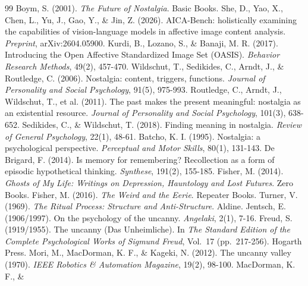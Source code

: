 \documentclass[11pt]{article}
\begin{document}
\begin{thebibliography}{99}
 Boym, S. (2001). \emph{The Future of Nostalgia}. Basic
Books.
 She, D., Yao, X., Chen, L., Yu, J., Gao, Y., \&
Jin, Z. (2026). AICA-Bench: holistically examining the capabilities of vision-language models in
affective image content analysis. \emph{Preprint}, arXiv:2604.05900.
 Kurdi, B., Lozano, S., \& Banaji, M. R. (2017).
Introducing the Open Affective Standardized Image Set (OASIS). \emph{Behavior Research
Methods}, 49(2), 457-470.
 Wildschut, T., Sedikides, C., Arndt, J.,
\& Routledge, C. (2006). Nostalgia: content, triggers, functions. \emph{Journal of
Personality and Social Psychology}, 91(5), 975-993.
 Routledge, C., Arndt, J., Wildschut, T.,
et al. (2011). The past makes the present meaningful: nostalgia as an existential
resource. \emph{Journal of Personality and Social Psychology}, 101(3), 638-652.
 Sedikides, C., \& Wildschut, T.
(2018). Finding meaning in nostalgia. \emph{Review of General Psychology}, 22(1), 48-61.
 Batcho, K. I. (1995). Nostalgia: a psychological
perspective. \emph{Perceptual and Motor Skills}, 80(1), 131-143.
 De Brigard, F. (2014). Is memory for
remembering? Recollection as a form of episodic hypothetical thinking. \emph{Synthese},
191(2), 155-185.
 Fisher, M. (2014). \emph{Ghosts of My Life:
Writings on Depression, Hauntology and Lost Futures}. Zero Books.
 Fisher, M. (2016). \emph{The Weird and the Eerie}.
Repeater Books.
 Turner, V. (1969). \emph{The Ritual Process:
Structure and Anti-Structure}. Aldine.
 Jentsch, E. (1906/1997). On the psychology of
the uncanny. \emph{Angelaki}, 2(1), 7-16.
 Freud, S. (1919/1955). The uncanny (Das
Unheimliche). In \emph{The Standard Edition of the Complete Psychological Works of
Sigmund Freud}, Vol.\ 17 (pp.\ 217-256). Hogarth Press.
 Mori, M., MacDorman, K. F., \& Kageki, N. (2012).
The uncanny valley (1970). \emph{IEEE Robotics \& Automation Magazine}, 19(2), 98-100.
 MacDorman, K. F., \&

\end{thebibliography}
\end{document}
